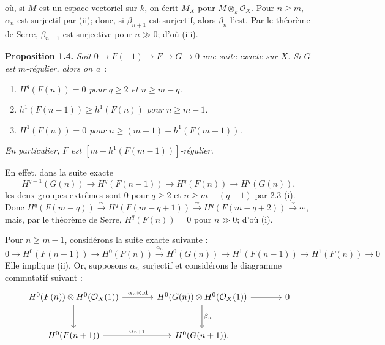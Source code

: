 où, si \(M\) est un
espace vectoriel sur \(k\), on écrit \(M_X\) pour \(M\otimes_k\mathcal O_X\). Pour \(n\ge m\), \(\alpha_n\) est surjectif par (ii); donc, si \(\beta_{n+1}\) est surjectif, alors \(\beta_n\) l'est. Par le théorème de Serre, \(\beta_{n+1}\) est surjective pour \(n\gg0\); d'où (iii).

\textbf{Proposition 1.4.} \emph{Soit \(0\to F(-1)\to F\to G\to0\) une suite exacte sur \(X\). Si \(G\) est \(m\)-régulier, alors on a}~:
\begin{enumerate}[label=(\roman*)]
\item \emph{\(H^q(F(n))=0\) pour \(q\ge2\) et \(n\ge m-q\).}
\item \emph{\(h^1(F(n-1))\ge h^1(F(n))\) pour \(n\ge m-1\).}
\item \emph{\(H^1(F(n))=0\) pour \(n\ge (m-1)+h^1(F(m-1))\).}
\end{enumerate}
\emph{En particulier, \(F\) est \([m+h^1(F(m-1))]\)-régulier.}

En effet, dans la suite exacte
\[
H^{q-1}(G(n))\longrightarrow H^q(F(n-1))\longrightarrow H^q(F(n))\longrightarrow H^q(G(n)),
\]
les deux groupes extrêmes sont \(0\) pour \(q\ge2\) et \(n\ge m-(q-1)\) par 2.3 (i). Donc \(H^q(F(m-q))\xrightarrow{\sim}H^q(F(m-q+1))\xrightarrow{\sim}H^q(F(m-q+2))\xrightarrow{\sim}\cdots\), mais, par le théorème de Serre, \(H^q(F(n))=0\) pour \(n\gg0\); d'où (i).

Pour \(n\ge m-1\), considérons la suite exacte suivante :
\[
0\to H^0(F(n-1))\to H^0(F(n))
  \xrightarrow{\alpha_n}H^0(G(n))\to H^1(F(n-1))
  \to H^1(F(n))\to0
\]
Elle implique (ii). Or, supposons \(\alpha_n\) surjectif et considérons le diagramme commutatif suivant :
\[
\begin{tikzcd}[column sep=large,row sep=large]
H^0(F(n))\otimes H^0(\mathcal O_X(1))
  \arrow[r,"\alpha_n\otimes\mathrm{id}"]
  \arrow[d]
& H^0(G(n))\otimes H^0(\mathcal O_X(1))
  \arrow[r]
  \arrow[d,"\beta_n"]
& 0 \\
H^0(F(n+1))
  \arrow[r,"\alpha_{n+1}"]
& H^0(G(n+1)).
\end{tikzcd}
\]
